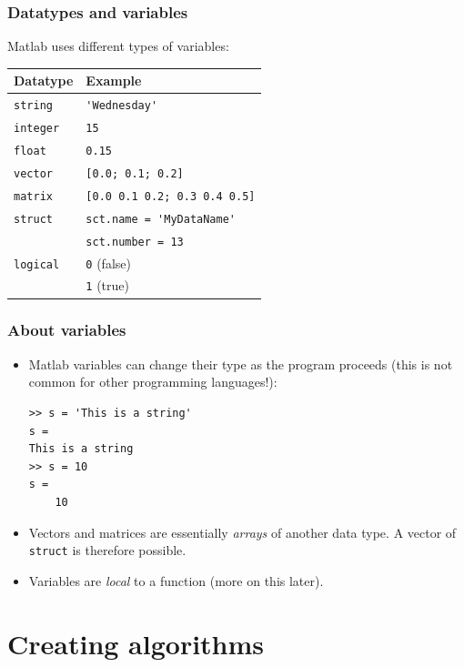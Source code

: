 \documentclass[11pt,table,final,fleqn,xcolor={usenames,dvipsnames},unknownkeysallowed,handout]{beamer}
\begin{document}
\begin{frame}[fragile]
 \frametitle{Datatypes and variables}
 Matlab uses different types of variables:
     \begin{longtable}{l!{\vrule}l}
      Datatype        & Example \\ \hline
      \texttt{string} & \lstinline$'Wednesday'$ \\
      \texttt{integer}& \lstinline$15$ \\
      \texttt{float}  & \lstinline$0.15$ \\
      \texttt{vector} & \lstinline$[0.0; 0.1; 0.2]$ \\
      \texttt{matrix} & \lstinline$[0.0 0.1 0.2; 0.3 0.4 0.5]$ \\
      \texttt{struct} & \lstinline$sct.name = 'MyDataName'$ \\
                      & \lstinline$sct.number = 13$ \\
      \texttt{logical}& \lstinline$0$ (false)  \\
                      & \lstinline$1$ (true) \\
    \end{longtable}
\end{frame}

\begin{frame}[fragile]
 \frametitle{About variables}
 \begin{itemize}
   \item Matlab variables can change their type as the program proceeds (this is not common for other programming languages!):
   \begin{lstlisting}
>> s = 'This is a string'
s =
This is a string
>> s = 10
s =
    10
\end{lstlisting}
    \item Vectors and matrices are essentially \emph{arrays} of another data type. A vector of \lstinline$struct$ is therefore possible.
    \item Variables are \emph{local} to a function (more on this later).
\end{itemize}
\end{frame}

\section{Creating algorithms}
\end{document}
